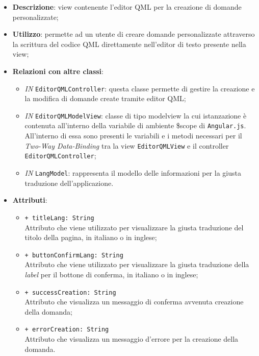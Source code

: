 \begin{itemize}
	\item \textbf{Descrizione}: view contenente l'editor QML per la creazione di domande personalizzate;
	\item \textbf{Utilizzo}: permette ad un utente di creare domande personalizzate attraverso la scrittura del codice QML direttamente nell'editor di testo presente nella view;
	\item \textbf{Relazioni con altre classi}:
	\begin{itemize}
		\item \textit{IN} \texttt{EditorQMLController}: questa classe permette di gestire la creazione e la modifica di domande create tramite editor QML;
		\item \textit{IN} \texttt{EditorQMLModelView}: classe di tipo modelview la cui istanzazione è contenuta all'interno della variabile di ambiente \$scope di \texttt{Angular.js}. All'interno di essa sono presenti le variabili e i metodi necessari per il \textit{Two-Way Data-Binding} tra la view \texttt{EditorQMLView} e il controller \texttt{EditorQMLController};
		\item \textit{IN} \texttt{LangModel}: rappresenta il modello delle informazioni per la giusta traduzione dell'applicazione.
	\end{itemize}
	\item \textbf{Attributi}:
	\begin{itemize}
		\item \texttt{+ titleLang: String} \\ Attributo che viene utilizzato per visualizzare la giusta traduzione del titolo della pagina, in italiano o in inglese;
		\item \texttt{+ buttonConfirmLang: String} \\ Attributo che viene utilizzato per visualizzare la giusta traduzione della \textit{label} per il bottone di conferma, in italiano o in inglese;
		\item \texttt{+ successCreation: String} \\ Attributo che visualizza un messaggio di conferma avvenuta creazione della domanda;
		\item \texttt{+ errorCreation: String} \\ Attributo che visualizza un messaggio d'errore per la creazione della domanda.
	\end{itemize}
\end{itemize}

